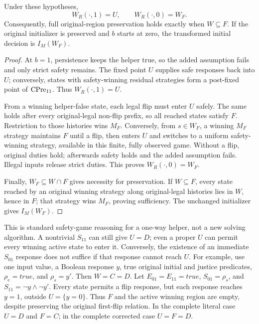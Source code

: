 \begin{proposition}
\label{prop:general-helper}
Under these hypotheses,
\[
 W_R(\cdot,1)=U,\qquad W_R(\cdot,0)=W_F.
\]
Consequently, full original-region preservation holds exactly when
$W\subseteq F$. If the original initializer is preserved and $b$
starts at zero, the transformed initial decision is $I_M(W_F)$.
\end{proposition}
\begin{proof}
At $b=1$, persistence keeps the helper true, so the added assumption
fails and only strict safety remains. The fixed point $U$ supplies safe
responses back into $U$; conversely, states with safety-winning residual
strategies form a post-fixed point of $\operatorname{CPre}_{11}$. Thus $W_R(\cdot,1)=U$.

From a winning helper-false state, each legal flip must enter $U$ safely.
The same holds after every original-legal non-flip prefix, so all reached
states satisfy $F$. Restriction to those histories wins $M_F$.
Conversely, from $s\in W_F$, a winning $M_F$ strategy maintains $F$ until a flip, then
enters $U$ and switches to a uniform safety-winning strategy, available
in this finite, fully observed game. Without a flip, original duties
hold; afterwards safety holds and the added assumption fails. Illegal
inputs release strict duties. This proves $W_R(\cdot,0)=W_F$.

Finally, $W_F\subseteq W\cap F$ gives necessity for preservation.
If $W\subseteq F$, every state reached by an original winning strategy
along original-legal histories lies in $W$, hence in $F$; that strategy
wins $M_F$, proving sufficiency.
The unchanged initializer gives $I_M(W_F)$.
\end{proof}

This is standard safety-game reasoning for a one-way helper,
not a new solving algorithm.
A nontrivial $S_{11}$ can still give $U=D$; even a proper $U$ can
permit every winning active state to enter it. Conversely, the
existence of an immediate $S_{01}$ response does not suffice if
that response cannot reach $U$. For example, use one input value,
a Boolean response $y$, true original initial and justice predicates,
$\rho_e=\mathit{true}$, and $\rho_s=y'$. Then $W=C=D$.
Let $E_{01}=E_{11}=\mathit{true}$,
$S_{01}=\rho_s$, and $S_{11}=\neg y\land\neg y'$.
Every state permits a flip response, but each response reaches
$y=1$, outside $U=\{y=0\}$. Thus $F$ and the active winning region
are empty, despite preserving the original first-flip relation.
In the complete literal case $U=D$ and $F=C$; in the
complete corrected case $U=F=D$.
